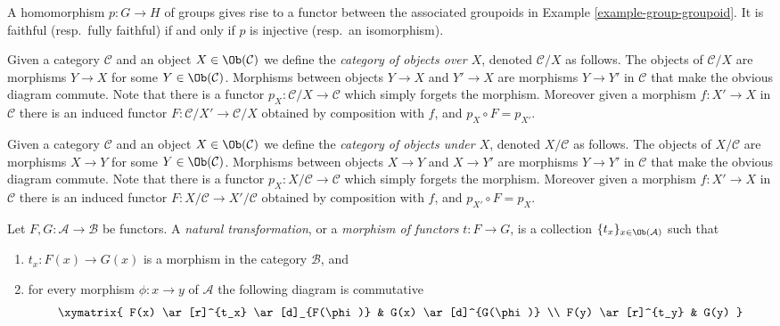 \begin{example}
\label{example-group-homomorphism-functor}
A homomorphism $p : G\to H$ of groups gives rise to a functor
between the associated groupoids in Example \ref{example-group-groupoid}. It is
faithful (resp.\ fully faithful) if and only if $p$ is injective (resp.\ an
isomorphism).
\end{example}

\begin{example}
\label{example-category-over-X}
Given a category $\mathcal{C}$ and an object $X\in \Ob(\mathcal{C})$
we define the {\it category of objects over $X$},
denoted $\mathcal{C}/X$ as follows.
The objects of $\mathcal{C}/X$ are morphisms $Y\to X$ for
some $Y\in \Ob(\mathcal{C})$. Morphisms between objects
$Y\to X$ and $Y'\to X$ are morphisms $Y\to Y'$ in $\mathcal{C}$ that
make the obvious diagram commute.  Note that there is a functor
$p_X : \mathcal{C}/X\to \mathcal{C}$ which simply forgets the
morphism.  Moreover given a morphism $f : X'\to X$ in
$\mathcal{C}$ there is an induced functor
$F : \mathcal{C}/X' \to \mathcal{C}/X$ obtained by composition with $f$,
and $p_X\circ F = p_{X'}$.
\end{example}

\begin{example}
\label{example-category-under-X}
Given a category $\mathcal{C}$ and an object $X\in \Ob(\mathcal{C})$
we define the {\it category of objects under $X$},
denoted $X/\mathcal{C}$ as follows.
The objects of $X/\mathcal{C}$ are morphisms $X\to Y$ for
some $Y\in \Ob(\mathcal{C})$. Morphisms between objects
$X\to Y$ and $X\to Y'$ are morphisms $Y\to Y'$ in $\mathcal{C}$ that
make the obvious diagram commute.  Note that there is a functor
$p_X : X/\mathcal{C}\to \mathcal{C}$ which simply forgets the
morphism.  Moreover given a morphism $f : X'\to X$ in
$\mathcal{C}$ there is an induced functor
$F : X/\mathcal{C} \to X'/\mathcal{C}$
obtained by composition with $f$,
and $p_{X'}\circ F = p_X$.
\end{example}




\begin{definition}
\label{definition-transformation-functors}
Let $F, G : \mathcal{A} \to \mathcal{B}$ be functors.
A {\it natural transformation}, or a {\it morphism of functors}
$t : F \to G$, is a collection $\{t_x\}_{x\in \Ob(\mathcal{A})}$
such that
\begin{enumerate}
\item $t_x : F(x) \to G(x)$ is a morphism in the category $\mathcal{B}$, and
\item for every morphism $\phi : x \to y$ of $\mathcal{A}$ the following
diagram is commutative
$$
\xymatrix{
F(x) \ar[r]^{t_x} \ar[d]_{F(\phi)} & G(x) \ar[d]^{G(\phi)} \\
F(y) \ar[r]^{t_y} & G(y) }
$$
\end{enumerate}
\end{definition}

